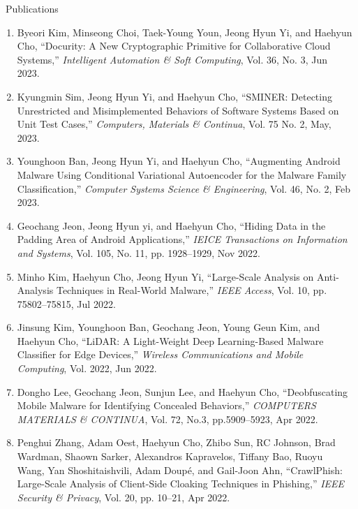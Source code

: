 \documentclass{resume} %
\begin{document}
\begin{rSection}{\faGenderless~Publications}
\begin{enumerate}[leftmargin=0pt]
    	\item Byeori Kim, Minseong Choi, Taek-Young Youn, Jeong Hyun Yi, and {Haehyun Cho},
    	``Docurity: A New Cryptographic Primitive for Collaborative Cloud Systems,''
    	\emph{Intelligent Automation \& Soft Computing},
    	Vol. 36, No. 3, Jun 2023.

    	\item Kyungmin Sim, Jeong Hyun Yi, and {Haehyun Cho},
    	``SMINER: Detecting Unrestricted and Misimplemented Behaviors of Software Systems Based on Unit Test Cases,''
    	\emph{Computers, Materials \& Continua},
    	Vol. 75 No. 2, May, 2023.

    	\item Younghoon Ban, Jeong Hyun Yi, and {Haehyun Cho},
    	``Augmenting Android Malware Using Conditional Variational Autoencoder for the Malware Family Classification,''
    	\emph{Computer Systems Science \& Engineering},
    	Vol. 46, No. 2, Feb 2023.

		\item Geochang Jeon, Jeong Hyun yi, and {Haehyun Cho}, 
		``Hiding Data in the Padding Area of Android Applications,''
		\emph{IEICE Transactions on Information and Systems},
		Vol. 105, No. 11, pp. 1928--1929, Nov 2022.

		\item Minho Kim, {Haehyun Cho}, Jeong Hyun Yi, 
		``Large-Scale Analysis on Anti-Analysis Techniques in Real-World Malware,''
		\emph{IEEE Access}, 
		Vol. 10,  pp. 75802--75815, Jul 2022.

		\item Jinsung Kim, Younghoon Ban, Geochang Jeon, Young Geun Kim, and {Haehyun Cho}, 
		``LiDAR: A Light-Weight Deep Learning-Based Malware Classifier for Edge Devices,''
		\emph{Wireless Communications and Mobile Computing}, 
		Vol. 2022, Jun 2022.

		\item Dongho Lee, Geochang Jeon, Sunjun Lee, and {Haehyun Cho},
		``Deobfuscating Mobile Malware for Identifying Concealed Behaviors,''
		\emph{COMPUTERS MATERIALS \& CONTINUA}, 
		Vol. 72, No.3, pp.5909--5923, Apr 2022.
		
		\item Penghui Zhang, Adam Oest, {Haehyun Cho}, Zhibo Sun, RC Johnson, Brad Wardman, Shaown Sarker, Alexandros Kapravelos, Tiffany Bao, Ruoyu Wang, Yan Shoshitaishvili, Adam Doup\'e, and Gail-Joon Ahn,
		``CrawlPhish: Large-Scale Analysis of Client-Side Cloaking Techniques in Phishing,''
		\emph{IEEE Security \& Privacy}, 
		Vol. 20, pp. 10--21, Apr 2022. 


\end{enumerate}
\end{rSection}
\end{document}
